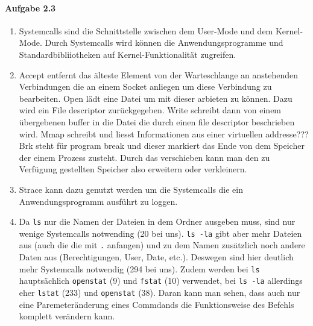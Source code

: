 \documentclass[11pt]{article}
\begin{document}
\paragraph{Aufgabe 2.3}
\begin{enumerate}[label = \alph*)]
\item Systemcalls sind die Schnittstelle zwischen dem User-Mode und dem Kernel-Mode. Durch Systemcalls wird können die Anwendungsprogramme und Standardbibliiotheken auf Kernel-Funktionalität zugreifen.

\item Accept entfernt das älteste Element von der Warteschlange an anstehenden Verbindungen die an einem Socket anliegen um diese Verbindung zu bearbeiten. Open lädt eine Datei um mit dieser arbieten zu können. Dazu wird ein File descriptor zurückgegeben. Write schreibt dann von einem übergebenen buffer in die Datei die durch einen file descriptor beschrieben wird. Mmap schreibt und liesst Informationen aus einer virtuellen addresse??? Brk steht für program break und dieser markiert das Ende von dem Speicher der einem Prozess zusteht. Durch das verschieben kann man den zu Verfügung gestellten Speicher also erweitern oder verkleinern.

\item Strace kann dazu genutzt werden um die Systemcalls die ein Anwendungsprogramm ausführt zu loggen.

\item Da \verb|ls| nur die Namen der Dateien in dem Ordner ausgeben muss, sind nur wenige Systemcalls notwending (20 bei uns). \verb|ls -la| gibt aber mehr Dateien aus (auch die die mit \verb|.| anfangen) und zu dem Namen zusätzlich noch andere Daten aus (Berechtigungen, User, Date, etc.). Deswegen sind hier deutlich mehr Systemcalls notwendig (294 bei uns). Zudem werden bei \verb|ls| hauptsächlich \verb|openstat| (9) und \verb|fstat| (10) verwendet, bei \verb|ls -la| allerdings eher \verb|lstat| (233) und \verb|openstat| (38). Daran kann man sehen, dass auch nur eine Paremeteränderung eines Commdands die Funktionsweise des Befehls komplett verändern kann.
\end{enumerate}
\end{document}
